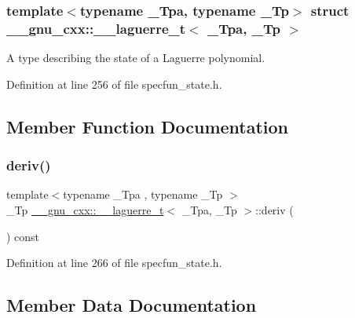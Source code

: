 \subsubsection*{template$<$typename \+\_\+\+Tpa, typename \+\_\+\+Tp$>$\newline
struct \+\_\+\+\_\+gnu\+\_\+cxx\+::\+\_\+\+\_\+laguerre\+\_\+t$<$ \+\_\+\+Tpa, \+\_\+\+Tp $>$}

A type describing the state of a Laguerre polynomial. 

Definition at line 256 of file specfun\+\_\+state.\+h.



\subsection{Member Function Documentation}
\mbox{\label{struct____gnu__cxx_1_1____laguerre__t_aed1a4e46a049188de5ca6c2cc9bc5cdf}} 
\subsubsection{\texorpdfstring{deriv()}{deriv()}}
{\footnotesize\ttfamily template$<$typename \+\_\+\+Tpa , typename \+\_\+\+Tp $>$ \\
\+\_\+\+Tp \hyperlink{struct____gnu__cxx_1_1____laguerre__t}{\+\_\+\+\_\+gnu\+\_\+cxx\+::\+\_\+\+\_\+laguerre\+\_\+t}$<$ \+\_\+\+Tpa, \+\_\+\+Tp $>$\+::deriv (\begin{DoxyParamCaption}{ }\end{DoxyParamCaption}) const\hspace{0.3cm}{\ttfamily [inline]}}



Definition at line 266 of file specfun\+\_\+state.\+h.



\subsection{Member Data Documentation}
\mbox{\label{struct____gnu__cxx_1_1____laguerre__t_a8aa1b08deed3b739c3de21953f2c5494}} 

